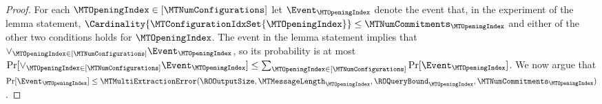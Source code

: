 \begin{proof}
For each $\MTOpeningIndex \in [\MTNumConfigurations]$ let $\Event_{\MTOpeningIndex}$ denote the event that, in the experiment of the lemma statement, $\Cardinality{\MTConfigurationIdxSet{\MTOpeningIndex}} \leq \MTNumCommitments_{\MTOpeningIndex}$ and either of the other two conditions holds for $\MTOpeningIndex$. The event in the lemma statement implies that $\lor_{\MTOpeningIndex \in [\MTNumConfigurations]} \Event_{\MTOpeningIndex}$, so its probability is at most $\Pr[\lor_{\MTOpeningIndex \in [\MTNumConfigurations]} \Event_{\MTOpeningIndex}] \leq \sum_{\MTOpeningIndex \in [\MTNumConfigurations]} \Pr[\Event_{\MTOpeningIndex}]$. We now argue that $\Pr[\Event_{\MTOpeningIndex}] \leq \MTMultiExtractionError(\ROOutputSize,\MTMessageLength_{\MTOpeningIndex},\ROQueryBound_{\MTOpeningIndex},\MTNumCommitments_{\MTOpeningIndex})$.


\end{proof}
